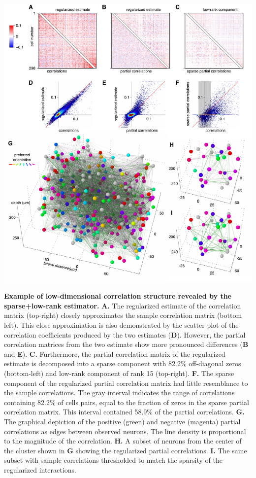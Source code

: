 \documentclass[10pt]{article}
\begin{document}
\begin{FPfigure}
    \begin{center}
        \includegraphics[width=17.35cm]{./figures/Figure05.pdf}
    \end{center}
    \caption{{\bf Example of low-dimensional correlation structure revealed by the sparse+low-rank estimator.}
    {\bf A.} The regularized estimate of the correlation matrix (top-right) closely approximates the sample correlation matrix (bottom left). 
    This close approximation is  also demonstrated by the scatter plot of the correlation coefficients produced by the two estimates ({\bf D}). 
    However, the partial correlation matrices from the two estimate show more pronounced differences ({\bf B} and {\bf E}). 
    {\bf C.} Furthermore, the partial correlation matrix of the regularized estimate is decomposed into a sparse component with 82.2\% off-diagonal zeros (bottom-left) and low-rank component of rank 15 (top-right).
    {\bf F.} The sparse component of the regularized partial correlation matrix had little resemblance to the sample correlations. The gray interval indicates the range of correlations containing 82.2\% of cells pairs, equal to the fraction of zeros in the sparse partial correlation matrix. This interval contained 58.9\% of the partial correlations. 
    {\bf G.} The graphical depiction of the positive (green) and negative (magenta) partial correlations as edges between observed neurons. The line density is proportional to the magnitude of the correlation.
    {\bf H.} A subset of neurons from the center of the cluster shown in {\bf G} showing the regularized partial correlations.
    {\bf I.} The same subset with sample correlations thresholded to match the sparsity of the regularized interactions.
}
\label{fig:05}
\end{FPfigure}
\end{document}
